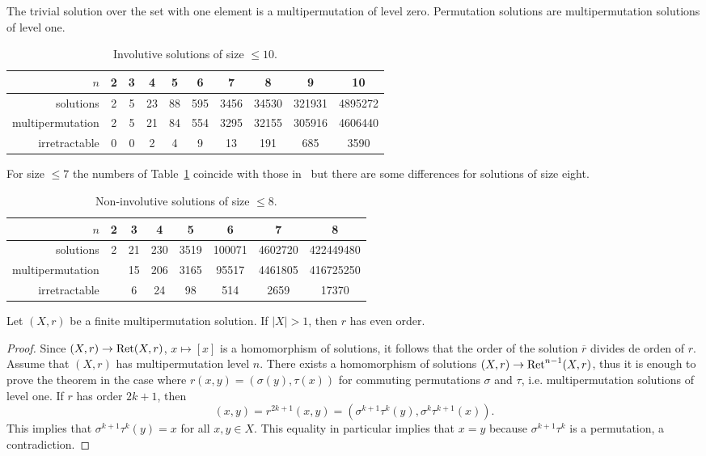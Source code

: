 The trivial solution over the set with one element is a multipermutation of level zero. 
Permutation solutions are multipermutation solutions of level one. 

\begin{example}

\end{example}

\begin{example}

\end{example}

\begin{table}[H]
\caption{Involutive solutions of size $\leq10$.}
\begin{tabular}{|r|ccccccccc|}
\hline
$n$ & 2 & 3 & 4 & 5 & 6 & 7 & 8 & 9 & 10\tabularnewline
\hline 
solutions & 2 & 5 & 23 & 88 & 595 & 3456 & 34530 & 321931 & 4895272\tabularnewline
multipermutation & 2 & 5 & 21 & 84 & 554 & 3295 & 32155 & 305916 & 4606440\tabularnewline
irretractable & 0 & 0 & 2 & 4 & 9 & 13 & 191 & 685 & 3590\tabularnewline
\hline
\end{tabular}
\label{tab:INV_mp}
\end{table}

For size $\leq7$ the numbers of Table~\ref{tab:INV_mp} coincide with those in~\cite{MR1722951}
but there are some differences for solutions of size eight. 

\begin{table}[H]
\caption{Non-involutive solutions of size $\leq8$.}
\begin{tabular}{|r|ccccccc|}
\hline
$n$ & 2 & 3 & 4 & 5 & 6 & 7 & 8 \tabularnewline
\hline 
solutions & 2 & 21 & 230 & 3519 & 100071 & 4602720  & 422449480 \tabularnewline
multipermutation &  & 15 & 206 & 3165 & 95517 & 4461805 & 416725250 \tabularnewline
irretractable & & 6 & 24 & 98 & 514 & 2659 & 17370\tabularnewline
\hline
\end{tabular}
\label{tab:mp}
\end{table}


\begin{theorem}
\label{thm:CJKAV}
    Let $(X,r)$ be a finite multipermutation solution. If $|X|>1$, then $r$ has even order. 
\end{theorem}

\begin{proof}
    Since $(X,r)\to\operatorname{Ret}(X,r)$, $x\mapsto[x]$ is a homomorphism of solutions, 
    it follows that the order of the solution $\overline{r}$ divides de orden of $r$. 
    Assume that $(X,r)$ has multipermutation level $n$. 
    There exists a homomorphism of solutions $(X,r)\to\operatorname{Ret}^{n-1}(X,r)$, thus 
    it is enough to prove the theorem in the case where
    $r(x,y)=(\sigma(y),\tau(x))$ for commuting permutations $\sigma$ and $\tau$, i.e. 
    multipermutation solutions of level one. If $r$ has order $2k+1$, then 
    \[
    (x,y)=r^{2k+1}(x,y)=(\sigma^{k+1}\tau^k(y),\sigma^k\tau^{k+1}(x)).
    \]
    This implies that $\sigma^{k+1}\tau^k(y)=x$ for all $x,y\in X$. This equality in particular 
    implies that $x=y$ because $\sigma^{k+1}\tau^k$ is a permutation, a contradiction. 
\end{proof}

